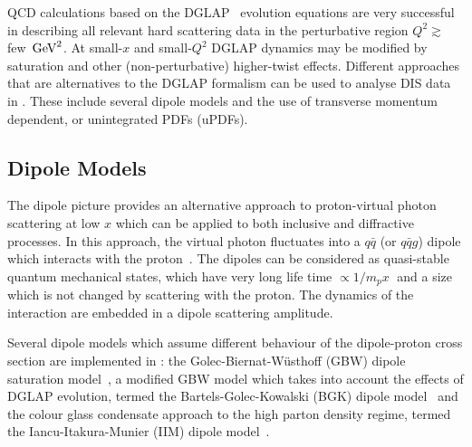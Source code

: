 

QCD calculations based on the DGLAP~\cite{Gribov:1972ri,Gribov:1972rt,Lipatov:1974qm,
Dokshitzer:1977sg,Altarelli:1977zs} evolution equations are very successful in describing
all relevant hard scattering data in the perturbative region $Q^2 \gtrsim $ few $ \,\text{Ge\hspace{-.08em}V}^2$.
At small-$x$ and small-$Q^2$ DGLAP dynamics may be modified
 by saturation and other (non-perturbative) higher-twist effects.
%
Different approaches that are alternatives to the DGLAP formalism can be used to analyse DIS data in \fitter.
These include several dipole models and the use of 
transverse momentum dependent, or unintegrated PDFs (uPDFs).

\subsection{Dipole Models}

The dipole picture provides an alternative approach to proton-virtual photon
 scattering at low $x$ which can be applied to both inclusive and 
diffractive processes.
 In this approach, the virtual photon fluctuates into a $q\bar q$ (or $q\bar q g$) 
 dipole which interacts with the proton~\cite{NNZ:91,Mueller:1993rr}.  
The dipoles can be considered as quasi-stable quantum mechanical states, which have very long 
life time $\propto 1/m_p x\;$ and a size which is not changed by scattering with the proton.
The dynamics of the interaction are embedded in a dipole scattering amplitude.

Several dipole models which assume different behaviour of the dipole-proton 
cross section are implemented in \fitter:
the Golec-Biernat-W\"usthoff (GBW)
dipole saturation model~\cite{Golec-Biernat:1998js},
a modified GBW model which takes into account the effects of  
DGLAP evolution, termed the Bartels-Golec-Kowalski (BGK) dipole model~\cite{Bartels:2002cj}
and the colour glass condensate approach to the high parton density 
regime, termed the Iancu-Itakura-Munier (IIM) dipole model~\cite{Iancu:2003ge}.

